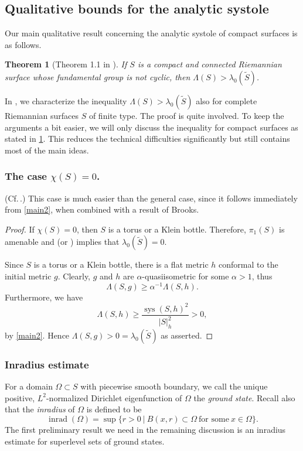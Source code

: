 \documentclass[a4paper,11pt]{amsart}
\numberwithin{equation}{section}
\newtheorem{thm}[equation]{Theorem}
\theoremstyle{definition}
\DeclareMathOperator{\inrad}{inrad}
\DeclareMathOperator{\sys}{sys}
\begin{document}
\subsection{Qualitative bounds for the analytic systole} \label{secas_qual}
Our main qualitative result concerning the analytic systole of compact surfaces is as follows.

\begin{thm}[Theorem 1.1 in \cite{BMM3}] \label{ana_sys_thm}
If $S$ is a compact and connected Riemannian surface whose fundamental group is not cyclic, then $\Lambda(S)>\lambda_0(\tilde S)$.
\end{thm}

In \cite[Theorem 1.2]{BMM3}, we characterize the inequality $\Lambda(S)>\lambda_0(\tilde S)$
also for complete Riemannian surfaces $S$ of finite type.
The proof is quite involved.
To keep the arguments a bit easier, we will only discuss the inequality for compact surfaces
as stated in \cref{ana_sys_thm}.
This reduces the technical difficulties significantly but still contains most of the main ideas.

\subsubsection{The case $\chi(S)=0$.} (Cf.\,\cite[Section 4]{BMM3}.)
This case is much easier than the general case, since it follows immediately from \cref{main2}, when combined with a result of Brooks.
\begin{proof}
If $\chi(S)=0$, then $S$ is a torus or a Klein bottle.
Therefore, $\pi_1(S)$ is amenable and \cite{Br2} (or \cite{BMP}) implies that $\lambda_0(\tilde S)=0$.

Since $S$ is a torus or a Klein bottle, there is a flat metric $h$ conformal to the initial metric $g$.
Clearly, $g$ and $h$ are $\alpha$-quasiisometric for some $\alpha>1$, thus
\begin{equation*}
\Lambda(S,g)\geq \alpha^{-1} \Lambda(S,h).
\end{equation*}
Furthermore, we have
\begin{equation*}
\Lambda(S,h)\geq \frac{\sys(S,h)^2}{|S|_h^2}>0,
\end{equation*}
by \cref{main2}.
Hence $\Lambda(S,g)>0=\lambda_0(\tilde S)$ as asserted.
\end{proof}

\subsubsection{Inradius estimate}
For a domain $\Omega\subset S$ with piecewise smooth boundary, we call the unique positive, $L^2$-normalized Dirichlet eigenfunction of $\Omega$ the \emph{ground state}.
Recall also that the \emph{inradius} of $\Omega$ is defined to be
\begin{equation*}
\inrad(\Omega)=\sup \{r>0 \ | \ B(x,r) \subset \Omega \ \text{for some}\ x \in \Omega \}.
\end{equation*}
The first preliminary result we need in the remaining discussion is an inradius estimate for superlevel sets of ground states.
\end{document}
